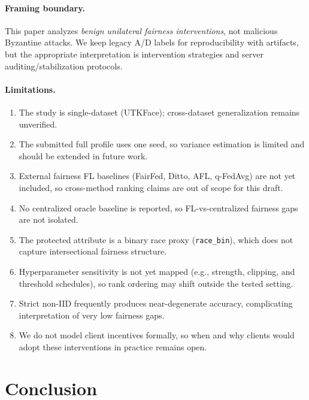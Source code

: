 ﻿\documentclass{article}
\begin{document}
\paragraph{Framing boundary.}
This paper analyzes \emph{benign unilateral fairness interventions}, not
malicious Byzantine attacks.
We keep legacy A/D labels for reproducibility with artifacts, but the
appropriate interpretation is intervention strategies and server
auditing/stabilization protocols.

\paragraph{Limitations.}
\begin{enumerate}[leftmargin=1.5em,itemsep=0pt]
  \item The study is single-dataset (UTKFace); cross-dataset
    generalization remains unverified.
  \item The submitted full profile uses one seed, so variance
    estimation is limited and should be extended in future work.
  \item External fairness FL baselines (FairFed, Ditto, AFL, q-FedAvg)
    are not yet included, so cross-method ranking claims are out of
    scope for this draft.
  \item No centralized oracle baseline is reported, so FL-vs-centralized
    fairness gaps are not isolated.
  \item The protected attribute is a binary race proxy
    (\texttt{race\_bin}), which does not capture intersectional
    fairness structure.
  \item Hyperparameter sensitivity is not yet mapped (e.g., strength,
    clipping, and threshold schedules), so rank ordering may shift
    outside the tested setting.
  \item Strict non-IID frequently produces near-degenerate accuracy,
    complicating interpretation of very low fairness gaps.
  \item We do not model client incentives formally, so when and why
    clients would adopt these interventions in practice remains open.
\end{enumerate}

\section{Conclusion}
\label{sec:conclusion}
\end{document}
